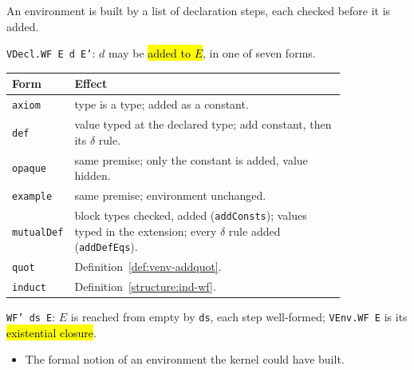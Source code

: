 An environment is built by a list of declaration steps, each checked before it is added.

\begin{definition}
\label{def:vdecl-wf}
\leanok
{}

 \texttt{VDecl.WF E d E'}: $d$ may be \hl{added to $E$}, in one of seven
forms.
\begin{center}
\begin{tabular}{lp{0.83\linewidth}}
\toprule
Form & Effect \\
\midrule
\texttt{axiom} & type is a type; added as a constant. \\
\texttt{def} & value typed at the declared type; add constant, then its $\delta$ rule. \\
\texttt{opaque} & same premise; only the constant is added, value hidden. \\
\texttt{example} & same premise; environment unchanged. \\
\texttt{mutualDef} & block types checked, added (\texttt{addConsts}); values typed in the
  extension; every $\delta$ rule added (\texttt{addDefEqs}). \\
\texttt{quot} & Definition~\ref{def:venv-addquot}. \\
\texttt{induct} & Definition~\ref{structure:ind-wf}. \\
\bottomrule
\end{tabular}\par\smallskip
\end{center}
\end{definition}

\begin{definition}
\label{def:venv-wf}
\leanok
{}

 \texttt{WF' ds E}: $E$ is reached from empty by \texttt{ds}, each step
well-formed; \texttt{VEnv.WF E} is its \hl{existential closure}.
\begin{itemize}
\item The formal notion of an environment the kernel could have built.
\end{itemize}
\end{definition}

